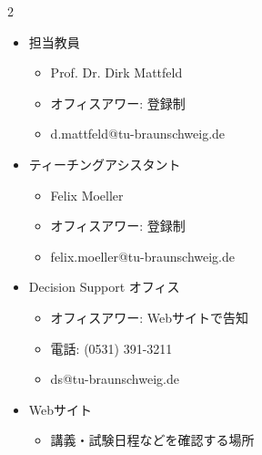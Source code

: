 \begin{multicols}{2}

\footnotesize

\raggedcolumns


\begin{itemize}
\item 担当教員
\begin{itemize}
\item Prof. Dr. Dirk Mattfeld
\item オフィスアワー: 登録制
\item d.mattfeld@tu-braunschweig.de
\end{itemize}
\item ティーチングアシスタント
\begin{itemize}
\item Felix Moeller
\item オフィスアワー: 登録制
\item felix.moeller@tu-braunschweig.de
\end{itemize}
\item Decision Support オフィス
\begin{itemize}
\item オフィスアワー: Webサイトで告知
\item 電話: (0531) 391-3211
\item ds@tu-braunschweig.de
\end{itemize}
\item Webサイト
\begin{itemize}
\item 講義・試験日程などを確認する場所
\end{itemize}
\end{itemize}

\end{multicols}

\clearpage



\vspace{1.5mm}

